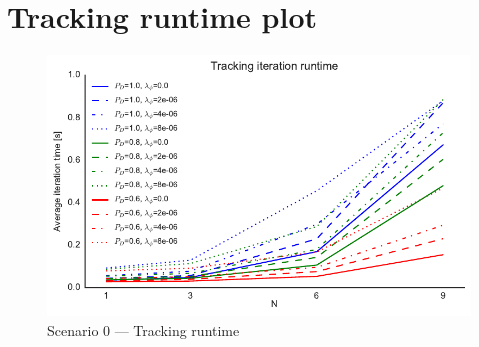 
\chapter{Tracking runtime plot}

\begin{figure}[H]
\centering
\includegraphics{Figures/plots/Scenario0_Tracking-Runtime.pdf}
\caption{Scenario 0 --- Tracking runtime}\label{fig:scenario0_tracking_runtime}
\end{figure}

